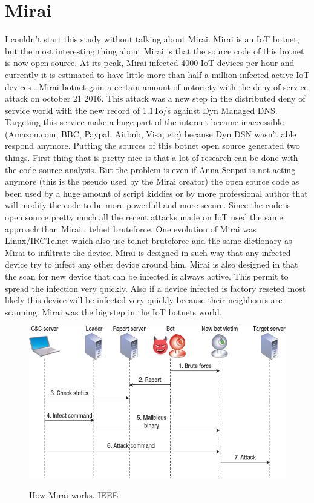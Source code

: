 \documentclass{report}
\begin{document}
\section{Mirai}
I couldn't start this study without talking about Mirai. Mirai is an IoT botnet, but the most interesting thing about Mirai is that the source code of this botnet is now open source. At its peak, Mirai infected 4000 IoT devices
per hour and currently it is estimated to have little more than half a million infected active IoT devices \autocite{angrishi2017turning}. Mirai botnet gain a certain amount of notoriety with the deny of service attack on october 21 2016. This attack was a new step in the distributed deny of service world with the new record of 1.1To/s against Dyn Managed DNS. Targeting this service make a huge part of the internet became inaccessible (Amazon.com, BBC, Paypal, Airbnb, Visa, etc) because Dyn DSN wasn't able respond anymore.\newline
Putting the sources of this botnet open source generated two things. First thing that is pretty nice is that a lot of research can be done with the code source analysis. But the problem is even if Anna-Senpai is not acting anymore (this is the pseudo used by the Mirai creator) the open source code as been used by a huge amount of script kiddies or by more professional author that will modify the code to be more powerfull and more secure. Since the code is open source pretty much all the recent attacks made on IoT used the same approach than Mirai : telnet bruteforce.
One evolution of Mirai was Linux/IRCTelnet which also use telnet bruteforce and the same dictionary as Mirai to infiltrate the device.\newline
\newline
Mirai is designed in such way that any infected device try to infect any other device around him. Mirai is also designed in that the scan for new device that can be infected is always active. This permit to spread the infection very quickly. Also if a device infected is factory reseted most likely this device will be infected very quickly because their neighbours are scanning. Mirai was the big step in the IoT botnets world.\newline
\newline
\begin{figure}[h]
 \caption{How Mirai works. IEEE \autocite{kolias2017ddos}}
 \centering
 \includegraphics[width=1.2\textwidth]{./img/botnet-fonct}
 \label{fig:botnet-fonct}
\end{figure}
\end{document}

